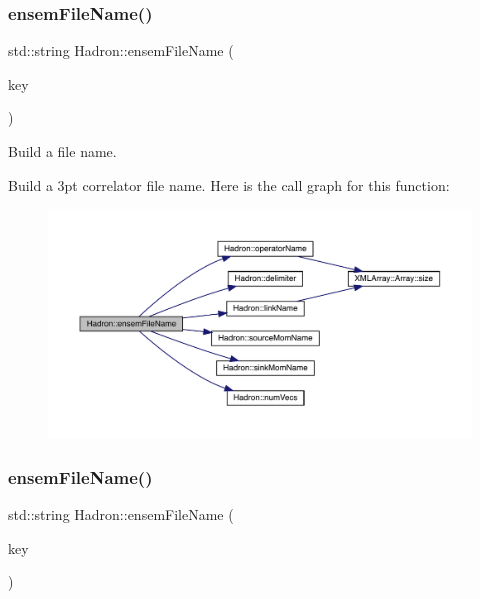 \subsubsection{\texorpdfstring{ensemFileName()}{ensemFileName()}\hspace{0.1cm}{\footnotesize\ttfamily [4/12]}}
{\footnotesize\ttfamily std\+::string Hadron\+::ensem\+File\+Name (\begin{DoxyParamCaption}\item[{const \mbox{\hyperlink{structFF_1_1KeyHadron3PtCorr__t}{F\+F\+::\+Key\+Hadron3\+Pt\+Corr\+\_\+t}} \&}]{key }\end{DoxyParamCaption})}



Build a file name. 

Build a 3pt correlator file name. Here is the call graph for this function\+:
\nopagebreak
\begin{figure}[H]
\begin{center}
\leavevmode
\includegraphics[width=350pt]{d1/daf/namespaceHadron_a1043f4c7b4a30f750e2484e69ff0a25b_cgraph}
\end{center}
\end{figure}
\mbox{\label{namespaceHadron_a427c61121d387abc689b090161709921}} 
\subsubsection{\texorpdfstring{ensemFileName()}{ensemFileName()}\hspace{0.1cm}{\footnotesize\ttfamily [5/12]}}
{\footnotesize\ttfamily std\+::string Hadron\+::ensem\+File\+Name (\begin{DoxyParamCaption}\item[{const \mbox{\hyperlink{structHadron_1_1KeyHadronNPartNPtConnGraph__t}{Key\+Hadron\+N\+Part\+N\+Pt\+Conn\+Graph\+\_\+t}} \&}]{key }\end{DoxyParamCaption})}



